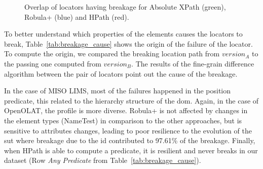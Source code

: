 \begin{figure}
\centering
{}
\caption{Overlap of locators having breakage for Absolute XPath (green), Robula+ (blue) and HPath (red).}  
\label{fig:changes_intersect}
\end{figure}

To better understand which properties of the elements causes the locators to break, Table~\ref{tab:breakage_cause} shows the origin of the failure of the locator. To compute the origin, we compared the breaking location path from  $version_A$ to the passing one computed from $version_B$. The results of the fine-grain difference algorithm between the pair of locators point out the cause of the breakage. 

In the case of MISO LIMS, most of the failures happened in the position predicate, this related to the hierarchy structure of the \gls{dom}. Again, in the case of OpenOLAT, the profile is more diverse. Robula+ is not affected by changes in the element types (NameTest) in comparison to the other approaches, but is sensitive to attributes changes, leading to poor resilience to the evolution of the \gls{sut} where breakage due to the id contributed to 97.61\% of the breakage. Finally, when HPath is able to compute a predicate, it is resilient and never breaks in our dataset (Row \emph{Any Predicate} from Table~\ref{tab:breakage_cause}).  

